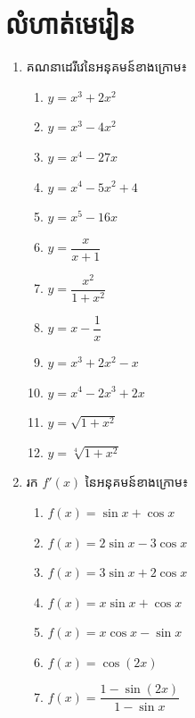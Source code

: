 \documentclass[12pt,fleqn]{book} %
\begin{document}
\section{លំហាត់មេរៀន}
\begin{enumerate}
\item គណនាដេរីវេនៃអនុគមន៍ខាងក្រោម៖
\begin{multicols}{2}
\begin{enumerate}
\item  $y=x^3+2x^2$
\item $y=x^3-4x^2$
\item $y=x^4-27x$
\item $y=x^4 -5x^2 +4$
\item $ y=x^5-16x$
\item $y= \dfrac{x}{x+1}$ 
\item $y=\dfrac{x^2}{1+x^2}$
 \item $y=x-\dfrac{1}{x}$
 \item $y=x^3 +2x^2 -x$
 \item $ y=x^4 -2x^3 +2x$
 \item $y= \sqrt{1+x^2}$
 \item $y=\sqrt[4]{1+x^2}$
\end{enumerate}
\end{multicols}
\item រក $f'(x)$ នៃអនុគមន៍ខាងក្រោម៖
\begin{multicols}{2}
\begin{enumerate}
\item $ f (x) = \sin x + \cos x$
\item $f(x)=2\sin x-3\cos x$
\item $ f(x)=3\sin x+2\cos x$
\item $ f (x) = x \sin x + \cos x$
\item  $f(x)=x\cos x-\sin  x$
\item $f (x) = \cos (2 x)$
\item $f(x)= \dfrac{1-\sin (2x)}{1-\sin x}$

\end{enumerate}
\end{multicols}
\end{enumerate}
\end{document}
